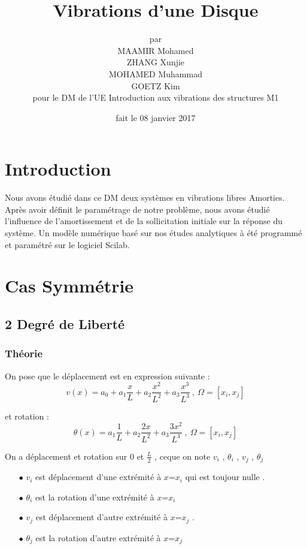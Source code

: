 \documentclass[a4paper,10pt]{report} %
\title{\textbf{Vibrations d'une Disque}} %
\author{par\\MAAMIR Mohamed\\ZHANG Xunjie\\MOHAMED Muhammad\\GOETZ Kim\\pour le DM de l'UE Introduction aux vibrations des structures M1} %
\date{fait le 08 janvier 2017} %
\begin{document}
\maketitle %
\tableofcontents %
\listoffigures %












\chapter{Introduction} %

Nous avons étudié dans ce DM deux systèmes en vibrations libres Amorties. Après avoir définit le paramétrage de notre problème, nous avons étudié l'influence de l'amortissement et de la sollicitation initiale sur la réponse du système.
Un modèle numérique basé sur nos études analytiques à été programmé et paramétré sur le logiciel Scilab.


\chapter{Cas Symmétrie}
\section{2 Degré de Liberté}
\subsection{Théorie}
On pose que le déplacement est en expression suivante :
\begin{equation}
v(x)=a_0+a_1\frac{x}{L}+a_2\frac{x^2}{L^2}+a_3\frac{x^3}{L^3} \ ,\  \Omega=[x_i,x_j]
\end{equation}


et rotation :
\begin{equation}
\theta(x)=a_1\frac{1}{L}+a_2\frac{2x}{L^2}+a_3\frac{3x^2}{L^3} \ ,\  \Omega=[x_i,x_j]
\end{equation}

On a déplacement et rotation sur $0$ et $\frac{L}{2}$ , ceque on note $v_i$ , $\theta_i$ , $v_j$ , $\theta_j$ \\
\begin{itemize}
    \item[$\bullet$]$v_i$ est déplacement d'une extrémité à $x$=$x_i$ qui est toujour nulle .
    \item[$\bullet$]$\theta_i$ est la rotation d'une extrémité à $x$=$x_i$
    \item[$\bullet$]$v_j$ est déplacement d'autre extrémité à $x$=$x_j$ .
    \item[$\bullet$]$\theta_j$ est la rotation d'autre extrémité à $x$=$x_j$
\end{itemize}
\end{document}
